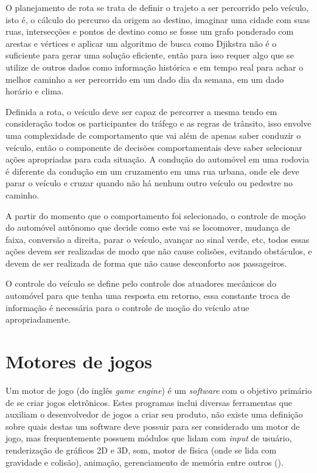 O planejamento de rota se trata de definir o trajeto a ser percorrido pelo veículo, isto é, o cálculo do percurso da origem ao destino, imaginar uma cidade com suas ruas, intersecções e pontos de destino como se fosse um grafo ponderado com arestas e vértices e aplicar um algoritmo de busca como Djikstra não é o suficiente para gerar uma solução eficiente, então para isso requer algo que se utilize de outros dados como informação histórica e em tempo real para achar o melhor caminho a ser percorrido em um dado dia da semana, em um dado horário e clima.

Definida a rota, o veículo deve ser capaz de percorrer a mesma tendo em consideração todos os participantes do tráfego e as regras de trânsito, isso envolve uma complexidade de comportamento que vai além de apenas saber conduzir o veículo, então o componente de decisões comportamentais deve saber selecionar ações apropriadas para cada situação. A condução do automóvel em uma rodovia é diferente da condução em um cruzamento em uma rua urbana, onde ele deve parar o veículo e cruzar quando não há nenhum outro veículo ou pedestre no caminho.

A partir do momento que o comportamento foi selecionado, o controle de moção do automóvel autônomo que decide como este vai se locomover, mudança de faixa, conversão a direita, parar o veículo, avançar ao sinal verde, etc, todos essas ações devem ser realizadas de modo que não cause colisões, evitando obstáculos, e devem de ser realizada de forma que não cause desconforto aos passageiros.

O controle do veículo se define pelo controle dos atuadores mecânicos do automóvel para que tenha uma resposta em retorno, essa constante troca de informação é necessária para o controle de moção do veículo atue apropriadamente.

\section{Motores de jogos}
Um motor de jogo (do inglês \textit{game engine}) é um \textit{software} com o objetivo primário de se criar jogos eletrônicos. Estes programas inclui diversas ferramentas que auxiliam o desenvolvedor de jogos a criar seu produto, não existe uma definição sobre quais destas um software deve possuir para ser considerado um motor de jogo, mas frequentemente possuem módulos que lidam com \textit{input} de usuário, renderização de gráficos 2D e 3D, som, motor de física (onde se lida com gravidade e colisão), animação, gerenciamento de memória entre outros (). 

